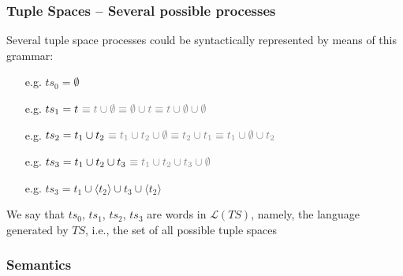 \documentclass[presentation]{beamer}\mode<presentation>{\usetheme{AMSCesenaPurpleAndGold}}
\begin{document}
\begin{frame}
\frametitle{Tuple Spaces -- Several possible processes}
    
    Several tuple space processes could be syntactically represented by means of this grammar:
    \vfill{}
    \begin{itemize}
        \item[e.g.] $ts_0 = \emptyset$
        
        \vfill
        
        \item[e.g.] $ts_1 = t {\ \color{gray}\equiv t \cup \emptyset \equiv \emptyset \cup t \equiv t \cup \emptyset \cup \emptyset }$
        
        \vfill
        
        \item[e.g.] $ts_2 = t_1 \cup t_2 {\ \color{gray} \equiv t_1 \cup t_2 \cup \emptyset \equiv t_2 \cup t_1 \equiv t_1 \cup \emptyset \cup t_2 }$
        
        \vfill
        
        \item[e.g.] $ts_3 = t_1 \cup t_2 \cup t_3 {\ \color{gray} \equiv t_1 \cup t_2 \cup t_3 \cup \emptyset }$
        
        \vfill
        
        \item[e.g.] $ts_3 = t_1 \cup \langle t_2 \rangle \cup t_3 \cup \langle t_2 \rangle$
        
    \end{itemize}
    
    \vfill
    
    \begin{block}{}
        We say that $ts_0$, $ts_1$, $ts_2$, $ts_3$ are \alert{words} in $\mathcal{L}(TS)$, namely, the language generated by $TS$, i.e., the set of all possible tuple spaces
    \end{block}
    
\end{frame}

\subsubsection{Semantics}
\end{document}
